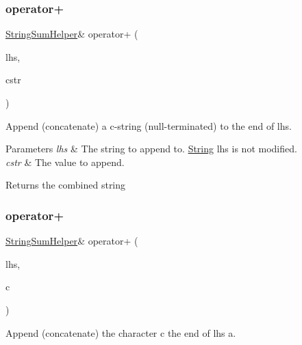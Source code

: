 \subsubsection{\texorpdfstring{operator+}{operator+}\hspace{0.1cm}{\footnotesize\ttfamily [2/10]}}
{\footnotesize\ttfamily \hyperlink{class_string_sum_helper}{String\+Sum\+Helper}\& operator+ (\begin{DoxyParamCaption}\item[{const \hyperlink{class_string_sum_helper}{String\+Sum\+Helper} \&}]{lhs,  }\item[{const char $\ast$}]{cstr }\end{DoxyParamCaption})\hspace{0.3cm}{\ttfamily [friend]}}



Append (concatenate) a c-\/string (null-\/terminated) to the end of lhs. 


\begin{DoxyParams}{Parameters}
{\em lhs} & The string to append to. \hyperlink{class_string}{String} lhs is not modified.\\
\hline
{\em cstr} & The value to append.\\
\hline
\end{DoxyParams}
\begin{DoxyReturn}{Returns}
the combined string 
\end{DoxyReturn}
\mbox{\label{class_string_a15c2c0bbe928e2bbf5278c8537bcfda4}} 
\subsubsection{\texorpdfstring{operator+}{operator+}\hspace{0.1cm}{\footnotesize\ttfamily [3/10]}}
{\footnotesize\ttfamily \hyperlink{class_string_sum_helper}{String\+Sum\+Helper}\& operator+ (\begin{DoxyParamCaption}\item[{const \hyperlink{class_string_sum_helper}{String\+Sum\+Helper} \&}]{lhs,  }\item[{char}]{c }\end{DoxyParamCaption})\hspace{0.3cm}{\ttfamily [friend]}}



Append (concatenate) the character c the end of lhs a. 


